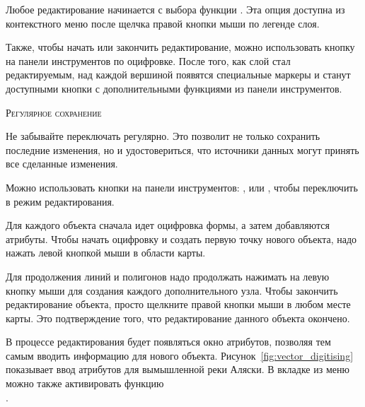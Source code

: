 Любое редактирование начинается с выбора функции
.
Эта опция доступна из контекстного меню после щелчка правой кнопки мыши
по легенде слоя.

Также, чтобы начать или закончить редактирование, можно использовать
кнопку 
 на панели инструментов
по оцифровке. После того, как слой стал редактируемым,
над каждой вершиной появятся специальные маркеры и станут доступными кнопки
с дополнительными функциями из панели инструментов.

\begin{Tip}\caption{\textsc{Регулярное сохранение}}
Не забывайте переключать 
регулярно. Это позволит не только сохранить последние изменения, но и удостовериться,
что источники данных могут принять все сделанные изменения.
\end{Tip}


Можно использовать кнопки на панели инструментов:
,
 или
, чтобы переключить \qg
в режим редактирования.

Для каждого объекта сначала идет оцифровка формы, а затем добавляются атрибуты.
Чтобы начать оцифровку и создать первую точку нового объекта, надо нажать
левой кнопкой мыши в области карты.

Для продолжения линий и полигонов надо продолжать нажимать на левую кнопку
мыши для создания каждого дополнительного узла. Чтобы закончить
редактирование объекта, просто щелкните правой кнопки мыши в любом
месте карты. Это подтверждение того, что редактирование данного объекта
окончено.

В процессе редактирования будет появляться окно атрибутов, позволяя тем
самым вводить информацию для нового объекта.
Рисунок~\ref{fig:vector_digitising} показывает ввод атрибутов для вымышленной реки
Аляски. В вкладке  из меню  \arrow
{} можно также активировать функцию \\
.


